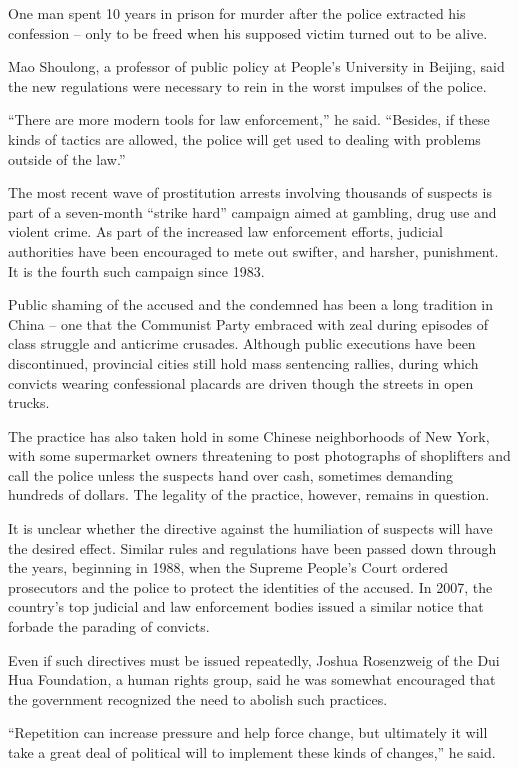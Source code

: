 ﻿\documentclass[12pt]{article}
\begin{document}
One man spent 10 years in prison for murder after the police extracted his confession -- only to be
freed when his supposed victim turned out to be alive.

Mao Shoulong, a professor of public policy at People's University in Beijing, said the new
regulations were necessary to rein in the worst impulses of the police.

``There are more modern tools for law enforcement,'' he said. ``Besides, if these kinds of tactics
are allowed, the police will get used to dealing with problems outside of the law.''

The most recent wave of prostitution arrests involving thousands of suspects is part of a
seven-month ``strike hard'' campaign aimed at gambling, drug use and violent crime. As part of the
increased law enforcement efforts, judicial authorities have been encouraged to mete out swifter,
and harsher, punishment. It is the fourth such campaign since 1983.

Public shaming of the accused and the condemned has been a long tradition in China -- one that the
Communist Party embraced with zeal during episodes of class struggle and anticrime crusades.
Although public executions have been discontinued, provincial cities still hold mass sentencing
rallies, during which convicts wearing confessional placards are driven though the streets in open
trucks.

The practice has also taken hold in some Chinese neighborhoods of New York, with some supermarket
owners threatening to post photographs of shoplifters and call the police unless the suspects hand
over cash, sometimes demanding hundreds of dollars. The legality of the practice, however, remains
in question.

It is unclear whether the directive against the humiliation of suspects will have the desired
effect. Similar rules and regulations have been passed down through the years, beginning in 1988,
when the Supreme People's Court ordered prosecutors and the police to protect the identities of the
accused. In 2007, the country's top judicial and law enforcement bodies issued a similar notice that
forbade the parading of convicts.

Even if such directives must be issued repeatedly, Joshua Rosenzweig of the Dui Hua Foundation, a
human rights group, said he was somewhat encouraged that the government recognized the need to
abolish such practices.

``Repetition can increase pressure and help force change, but ultimately it will take a great deal
of political will to implement these kinds of changes,'' he said.
\end{document}
